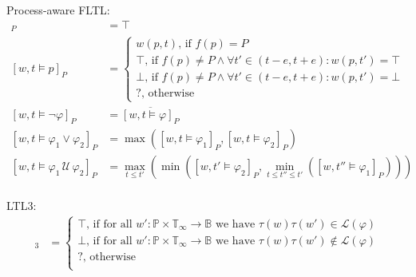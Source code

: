 \documentclass[envcountsame, runningheads]{llncs}
\newcommand{\B}{\mathbb{B}}
\def\until{\,\mathcal{U}\,}
\def\since{\,\mathcal{S}\,}
\newcommand{\?}{\text{?}}
\begin{document}
	Process-aware FLTL:
	\begin{align*}
		[w,t \models \texttt{true}]_P &= \top \\
		[w,t \models p]_P &= \begin{cases}
			w(p,t) \text{, if } f(p) = P\\
			\top \text{, if } f(p) \not = P \land \forall t' \in (t - e, t + e) : w(p, t') = \top\\
			\bot \text{, if } f(p) \not = P \land \forall t' \in (t - e, t + e) : w(p, t') = \bot\\
			? \text{, otherwise}
		\end{cases} \\
		[w,t \models \lnot \varphi]_P &= \overline{[w,t \models \varphi]_P}\\
		[w,t \models \varphi_1 \lor \varphi_2]_P &= \max([w,t \models \varphi_1]_P, [w,t \models \varphi_2]_P)\\
		[w,t \models \varphi_1 \until \varphi_2]_P &= \max_{t \leq t'} \left( \min \left( [w,t' \models \varphi_2]_P, \min_{t \leq t'' \leq t'} \left( [w,t'' \models \varphi_1]_P \right) \right) \right)\\
	\end{align*}
	
	LTL3:
	\begin{align*}
		[w,t \models \varphi]_3 &= \begin{cases}
			\top \text{, if for all }  w' : \mathbb{P} \times \mathbb{T}_\infty \to \B  \text{ we have } \tau(w) \tau(w') \in \mathcal{L}(\varphi)\\
			\bot \text{, if for all }  w' : \mathbb{P} \times \mathbb{T}_\infty \to \B  \text{ we have } \tau(w) \tau(w') \notin \mathcal{L}(\varphi)\\
			? \text{, otherwise}\\
		\end{cases}
	\end{align*}
	
\end{document}
